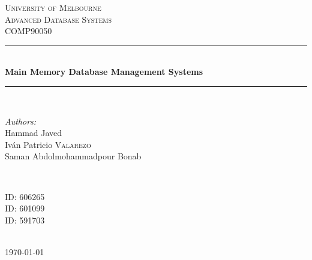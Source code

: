 \documentclass[12pt]{article} %
\begin{document}

\begin{titlepage}

\newcommand{\HRule}{\rule{\linewidth}{0.5mm}} %

\center %

\textsc{\LARGE University of Melbourne}\\[1.5cm]
\textsc{\Large Advanced Database Systems}\\[0.5cm] 
\textsc{\large COMP90050}\\[0.5cm] 

\HRule \\[0.4cm]
{ \huge \bfseries Main Memory Database Management Systems}\\[0.4cm] %
\HRule \\[1.5cm]

\begin{minipage}{0.4\textwidth}
\begin{flushleft} \large
\emph{Authors:}\\
Hammad Javed\\
Iv\'an Patricio \textsc{Valarezo}\\ %
Saman Abdolmohammadpour Bonab\\
\end{flushleft}
\end{minipage}
~
\begin{minipage}{0.4\textwidth}
\begin{flushright} \large
ID: \textsc{606265}\\
ID: \textsc{601099}\\ 
ID: \textsc{591703}\\
\end{flushright}
\end{minipage}\\[4cm]

{\large \today}\\[3cm] %


\vfill %

\end{titlepage}
\end{document}
